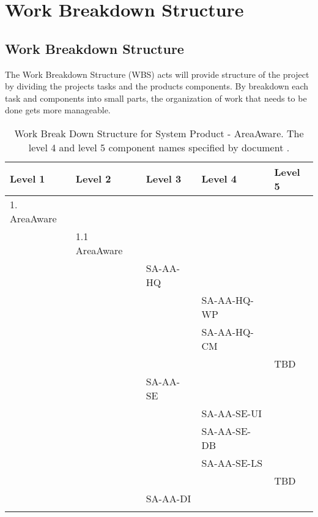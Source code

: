 \section{Work Breakdown Structure}
\subsection{Work Breakdown Structure}
The Work Breakdown Structure (WBS) acts will provide structure of the project by dividing the projects tasks and the products components.
By breakdown each task and components into small parts, the organization of work that needs to be done gets more manageable.
\begin{table}[]
\centering
\caption{Work Break Down Structure for System Product - AreaAware. The level 4 and level 5 component names specified by document \pdd.}
\label{tab:wbs_sysproduct}
\begin{tabular}{lllll}\hline
Level 1 & Level 2 & Level 3 & Level 4 & Level 5 \\\hline
1. AreaAware   &             &           &             &         \\
            & 1.1 AreaAware  &           &             &         \\
            &                &  SA-AA-HQ &             &         \\
            &                &           & SA-AA-HQ-WP &         \\
            &                &           & SA-AA-HQ-CM &         \\
            &                &           &             & TBD     \\
            &                &  SA-AA-SE &             &         \\
            &                &           & SA-AA-SE-UI &         \\
            &                &           & SA-AA-SE-DB &         \\
            &                &           & SA-AA-SE-LS &         \\
            &                &           &             & TBD     \\
            &                &  SA-AA-DI &             &         \\
            &                &           &             &         \\\hline
\end{tabular}
\end{table}

